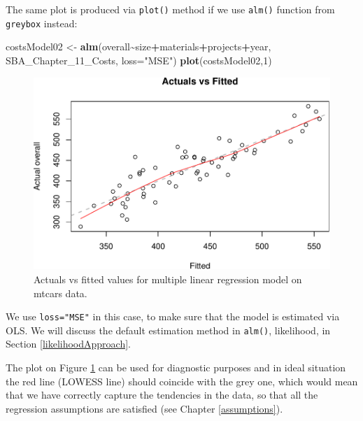 \documentclass[
]{book}
\newenvironment{Shaded}{\begin{snugshade}}{\end{snugshade}}
\newcommand{\AttributeTok}[1]{\textcolor[rgb]{0.13,0.29,0.53}{#1}}
\newcommand{\DecValTok}[1]{\textcolor[rgb]{0.00,0.00,0.81}{#1}}
\newcommand{\FunctionTok}[1]{\textcolor[rgb]{0.13,0.29,0.53}{\textbf{#1}}}
\newcommand{\NormalTok}[1]{#1}
\newcommand{\OtherTok}[1]{\textcolor[rgb]{0.56,0.35,0.01}{#1}}
\newcommand{\SpecialCharTok}[1]{\textcolor[rgb]{0.81,0.36,0.00}{\textbf{#1}}}
\newcommand{\StringTok}[1]{\textcolor[rgb]{0.31,0.60,0.02}{#1}}
\theoremstyle{definition}
\theoremstyle{definition}
\theoremstyle{definition}
\theoremstyle{definition}
\theoremstyle{remark}
\begin{document}
The same plot is produced via \texttt{plot()} method if we use \texttt{alm()} function from \texttt{greybox} instead:

\begin{Shaded}
\begin{Highlighting}[]
\NormalTok{costsModel02 }\OtherTok{\textless{}{-}} \FunctionTok{alm}\NormalTok{(overall}\SpecialCharTok{\textasciitilde{}}\NormalTok{size}\SpecialCharTok{+}\NormalTok{materials}\SpecialCharTok{+}\NormalTok{projects}\SpecialCharTok{+}\NormalTok{year, SBA\_Chapter\_11\_Costs, }\AttributeTok{loss=}\StringTok{"MSE"}\NormalTok{)}
\FunctionTok{plot}\NormalTok{(costsModel02,}\DecValTok{1}\NormalTok{)}
\end{Highlighting}
\end{Shaded}

\begin{figure}
\centering
\includegraphics{Svetunkov---Statistics-for-Business-Analytics_files/figure-latex/costsModel02Plot-1.pdf}
\caption{\label{fig:costsModel02Plot}Actuals vs fitted values for multiple linear regression model on mtcars data.}
\end{figure}

We use \texttt{loss="MSE"} in this case, to make sure that the model is estimated via OLS. We will discuss the default estimation method in \texttt{alm()}, likelihood, in Section \ref{likelihoodApproach}.

The plot on Figure \ref{fig:costsModel02Plot} can be used for diagnostic purposes and in ideal situation the red line (LOWESS line) should coincide with the grey one, which would mean that we have correctly capture the tendencies in the data, so that all the regression assumptions are satisfied (see Chapter \ref{assumptions}).
\end{document}
